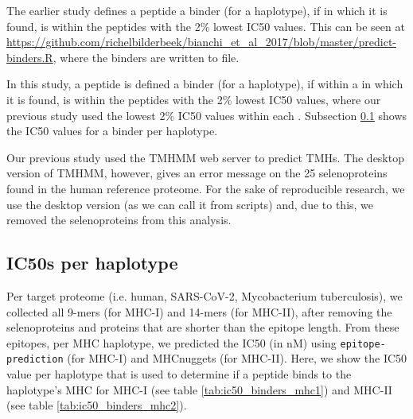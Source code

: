 The earlier study defines a peptide a binder (for a haplotype), 
if  in which it is found, 
is within the peptides with the 2\% lowest IC50 values.
This can be seen at \url{https://github.com/richelbilderbeek/bianchi_et_al_2017/blob/master/predict-binders.R},
where the binders are written to file.

In this study, a peptide is defined a binder (for a haplotype), 
if within a  in which it is found, 
is within the peptides with the 2\% lowest IC50 values,
where our previous study used the lowest 2\% IC50 values
within each .
Subsection \ref{subsec:ic50s_per_haplotype} shows the IC50 values
for a binder per haplotype.


Our previous study used the TMHMM web server
to predict TMHs.
The desktop version of TMHMM, however, gives an
error message on the 25 selenoproteins found in the human
reference proteome.
For the sake of reproducible research, we use the desktop version (as
we can call it from scripts) and, due to this, we removed the
selenoproteins from this analysis.

\subsection{IC50s per haplotype}
\label{subsec:ic50s_per_haplotype}

Per target proteome (i.e. human, SARS-CoV-2, Mycobacterium tuberculosis),
we collected all 9-mers (for MHC-I) and 14-mers (for MHC-II),
after removing the selenoproteins and proteins that are shorter
than the epitope length.
From these epitopes, per MHC haplotype,
we predicted the IC50 (in nM) using \verb;epitope-prediction; (for MHC-I)
and MHCnuggets (for MHC-II). 
Here, we show the IC50 value per haplotype that
is used to determine if a peptide binds to the haplotype's MHC
for MHC-I (see table \ref{tab:ic50_binders_mhc1}) and 
MHC-II (see table \ref{tab:ic50_binders_mhc2}).





